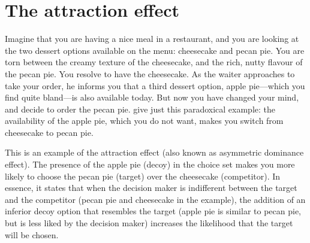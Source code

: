 \documentclass[12pt, a4paper]{article}
\begin{document}




\newpage


\section*{The attraction effect}


Imagine that you are having a nice meal in a restaurant, and you are looking at the two dessert options available on the menu: cheesecake and pecan pie. You are torn between the creamy texture of the cheesecake, and the rich, nutty flavour of the pecan pie. You resolve to have the cheesecake. As the waiter approaches to take your order, he informs you that a third dessert option, apple pie---which you find quite bland---is also available today. But now you have changed your mind, and decide to order the pecan pie.  give just this paradoxical example: the availability of the apple pie, which you do not want, makes you switch from cheesecake to pecan pie.

This is an example of the attraction effect (also known as asymmetric dominance effect). The presence of the apple pie (decoy) in the choice set makes you more likely to choose the pecan pie (target) over the cheesecake (competitor). In essence, it states that when the decision maker is indifferent between the target and the competitor (pecan pie and cheesecake in the example), the addition of an inferior decoy option that resembles the target (apple pie is similar to pecan pie, but is less liked by the decision maker) increases the likelihood that the target will be chosen.
\end{document}
